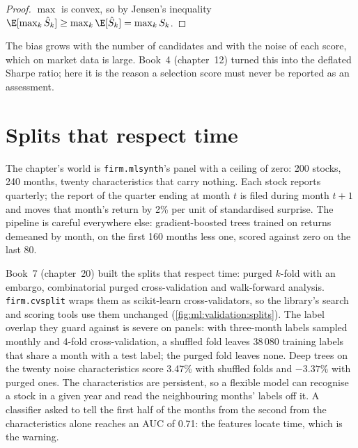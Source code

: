 \begin{proof}
$\max$ is convex, so by Jensen's inequality $\E[\max_k\hat S_k] \ge \max_k\E[\hat S_k] = \max_kS_k$.
\end{proof}

The bias grows with the number of candidates and with the noise of each score, which on market data is large. Book~4
(chapter~12) turned this into the deflated Sharpe ratio; here it is the reason a selection score must never be reported
as an assessment.

\section{Splits that respect time}

The chapter's world is \texttt{firm.mlsynth}'s panel with a ceiling of zero: 200 stocks, 240 months, twenty
characteristics that carry nothing. Each stock reports quarterly; the report of the quarter ending at month $t$ is filed
during month $t+1$ and moves that month's return by 2\% per unit of standardised surprise. The pipeline is careful
everywhere else: gradient-boosted trees trained on returns demeaned by month, on the first 160 months less one, scored
against zero on the last 80.

Book~7 (chapter~20) built the splits that respect time: purged $k$-fold with an embargo, combinatorial purged
cross-validation and walk-forward analysis. \texttt{firm.cvsplit} wraps them as scikit-learn cross-validators, so the
library's search and scoring tools use them unchanged (\cref{fig:ml:validation:splits}). The label overlap they guard
against is severe on panels: with three-month labels sampled monthly and 4-fold cross-validation, a shuffled fold leaves
38\,080 training labels that share a month with a test label; the purged fold leaves none. Deep trees on the twenty
noise characteristics score 3.47\% with shuffled folds and $-3.37\%$ with purged ones. The characteristics are
persistent, so a flexible model can recognise a stock in a given year and read the neighbouring months' labels off it.
A classifier asked to tell the first half of the months from the second from the characteristics alone reaches an AUC
of 0.71: the features locate time, which is the warning.

